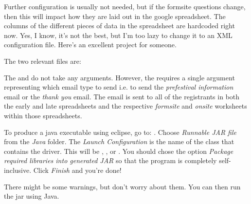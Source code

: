 \documentclass[12pt,final]{article}
\begin{document}

Further configuration is usually not needed, but if the formsite questions
change, then this will impact how they are laid out in the google spreadsheet.
The columns of the different pieces of data in the spreadsheet are hardcoded
right now. Yes, I know, it's not the best, but I'm too lazy to change it to an
XML configuration file. Here's an excellent project for someone.

The two relevant files are:
\benum
\eenum


The  and  do not take any
arguments. However, the  requires a single argument
representing which email type to send i.e. to send the \emph{prefestival
information} email or the \emph{thank you} email. The email is sent to all of
the  registrants in both the early and late spreadsheets and the
respective \emph{formsite} and \emph{onsite} worksheets within those
spreadsheets.


To produce a java executable using eclipse, go to:
. Choose \emph{Runnable JAR file} from the
\emph{Java} folder. The \emph{Launch Configuration} is the name of the class
that contains the driver. This will be ,
, or . You should chose the option
\emph{Package required libraries into generated JAR} so that the program is
completely self-inclusive. Click \emph{Finish} and you're done!

There might be some warnings, but don't worry about them. You can then run the
jar using Java. 
\end{document}
